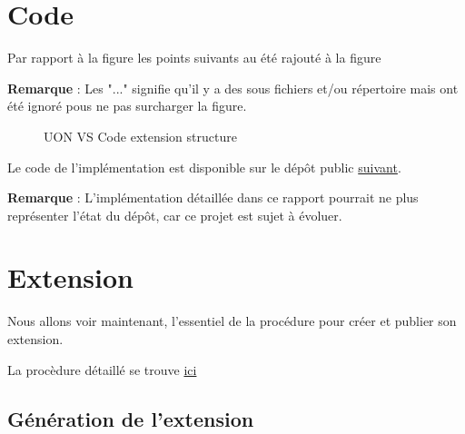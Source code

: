 \documentclass[
    iict, %
    il, %
]{heig-tb}
\begin{document}
\section{Code}

Par rapport à la figure %
les points suivants au été rajouté à la figure %

\textbf{Remarque} : Les "..." signifie qu'il y a des sous fichiers et/ou répertoire mais ont été ignoré pous ne pas surcharger
la figure.

\begin{figure}[!h]
    \centering
    \caption{UON VS Code extension structure}
\end{figure}

Le code de l'implémentation est disponible sur le dépôt public \href{https://github.com/vitorva/vscode-uon}{suivant}.

\textbf{Remarque} : L'implémentation détaillée dans ce rapport pourrait ne plus représenter l'état du dépôt, car ce projet est sujet à évoluer.

\section{Extension}
Nous allons voir maintenant, l'essentiel de la procédure pour créer et publier son extension.

La procèdure détaillé se trouve \href{https://code.visualstudio.com/api/get-started/your-first-extension
}{ici}

\subsection{Génération de l'extension}
\end{document}
